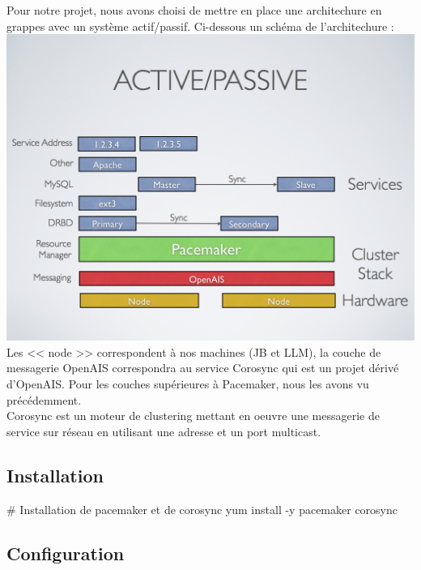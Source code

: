 \documentclass[11pt,a4paper]{report}
\begin{document}
                Pour notre projet, nous avons choisi de mettre en place une architechure en grappes avec un système actif/passif. Ci-dessous un schéma de l'architechure :\\
                
                \includegraphics[keepaspectratio=true, width=\textwidth]{content/pacemaker-active-passive.png}\\[1cm]
                
                Les << node >> correspondent à nos machines (JB et LLM), la couche de messagerie OpenAIS correspondra au service Corosync qui est un projet dérivé d'OpenAIS. Pour les couches supérieures à Pacemaker, nous les avons vu précédemment.\\
                
                Corosync est un moteur de clustering mettant en oeuvre une messagerie de service sur réseau en utilisant une adresse et un port multicast.
            
            \subsection{Installation}
            
                \begin{bashcode}
                    # Installation de pacemaker et de corosync
                    yum install -y pacemaker corosync
                \end{bashcode}
            
            \subsection{Configuration}
                
\end{document}
